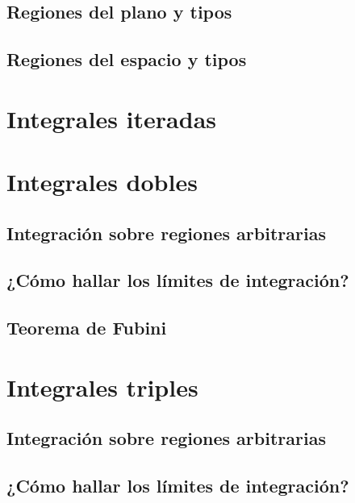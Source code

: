 \documentclass[12pt, fleqn]{report}                             %
\theoremstyle{break}                                            %
\begin{document}
            \subsection{Regiones del plano y tipos}
            
            \subsection{Regiones del espacio y tipos}
        
        \section{Integrales iteradas}
        
        \section{Integrales dobles}
            
            \subsection{Integración sobre regiones arbitrarias}
            
            \subsection{¿Cómo hallar los límites de integración?}
            
            \subsection{Teorema de Fubini}
        
        \section{Integrales triples}
            
            \subsection{Integración sobre regiones arbitrarias}
            
            \subsection{¿Cómo hallar los límites de integración?}
            
\end{document}
